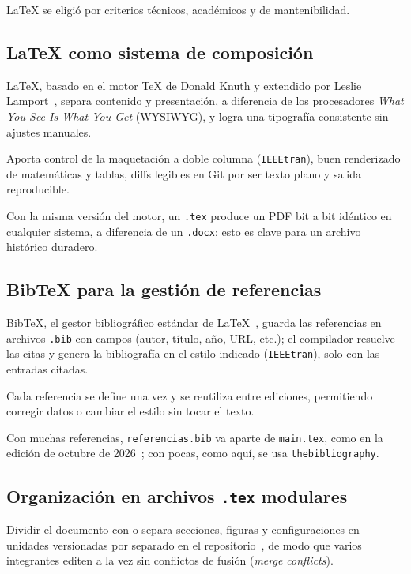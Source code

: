 \documentclass[conference,twocolumn,spanish]{IEEEtran}
\begin{document}
\LaTeX{} se eligió por criterios técnicos, académicos y de
mantenibilidad.

\subsection{\LaTeX{} como sistema de composición}

\LaTeX{}, basado en el motor \TeX{} de Donald Knuth y extendido por
Leslie Lamport~\cite{lamport}, separa contenido y presentación, a
diferencia de los procesadores \textit{What You See Is What You Get}
(WYSIWYG), y logra una tipografía consistente sin ajustes manuales.

Aporta control de la maquetación a doble columna (\texttt{IEEEtran}),
buen renderizado de matemáticas y tablas, diffs legibles en Git por ser
texto plano y salida reproducible.

Con la misma versión del motor, un \texttt{.tex} produce un PDF bit a
bit idéntico en cualquier sistema, a diferencia de un \texttt{.docx};
esto es clave para un archivo histórico duradero.

\subsection{Bib\TeX{} para la gestión de referencias}

Bib\TeX{}, el gestor bibliográfico estándar de \LaTeX{}~\cite{lamport},
guarda las referencias en archivos \texttt{.bib} con campos (autor,
título, año, URL, etc.); el compilador resuelve las citas y genera la
bibliografía en el estilo indicado (\texttt{IEEEtran}), solo con las
entradas citadas.

Cada referencia se define una vez y se reutiliza entre ediciones,
permitiendo corregir datos o cambiar el estilo sin tocar el texto.

Con muchas referencias, \texttt{referencias.bib} va aparte de
\texttt{main.tex}, como en la edición de octubre de
2026~\cite{ediciones}; con pocas, como aquí, se usa
\texttt{thebibliography}.

\subsection{Organización en archivos \texttt{.tex} modulares}

Dividir el documento con \verb|| o \verb|| separa
secciones, figuras y configuraciones en unidades versionadas por
separado en el repositorio~\cite{repo}, de modo que varios integrantes
editen a la vez sin conflictos de fusión (\textit{merge conflicts}).
\end{document}
